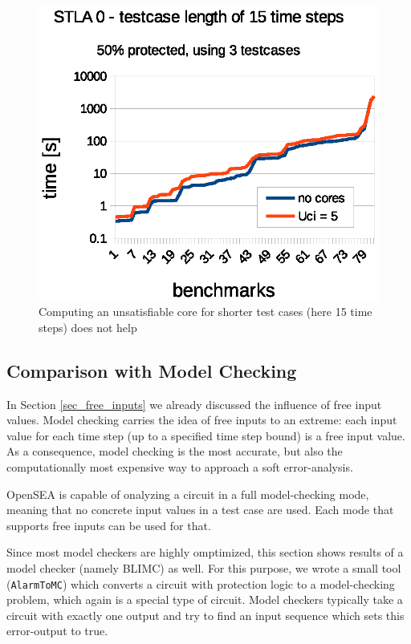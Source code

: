 \documentclass[a4paper,10pt]{article}
\begin{document}
\begin{figure}[!htb]
\centering
\includegraphics[scale = 0.64]{img/uci-15ts.eps}
\centering \caption{Computing an unsatisfiable core for shorter test cases (here 15 time steps) does not help} 
\label{uci-15ts}
\end{figure}

\subsection{Comparison with Model Checking}
In Section \ref{sec_free_inputs} we already discussed the influence of free input values. 
Model checking carries the idea of free inputs to an extreme: each input value for each time step (up to a specified time step bound) is a free input value. 
As a consequence, model checking is the most accurate, but also the computationally most expensive way to approach a soft error-analysis.

OpenSEA is capable of onalyzing a circuit in a full model-checking mode, meaning that no concrete input values in a test case are used. 
Each mode that supports free inputs can be used for that.

Since most model checkers are highly omptimized, this section shows results of a model checker (namely BLIMC) as well.
For this purpose, we wrote a small tool (\texttt{AlarmToMC}) which converts a circuit with protection logic to a model-checking problem, which again is a special type of circuit.
Model checkers typically take a circuit with exactly one output and try to find an input sequence which sets this error-output to true. 
\end{document}
